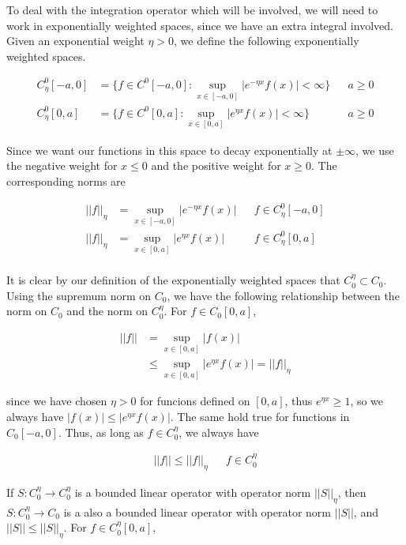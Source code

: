 \documentclass[12pt]{article}
\begin{document}
To deal with the integration operator which will be involved, we will need to work in exponentially weighted spaces, since we have an extra integral involved. Given an exponential weight $\eta > 0$, we define the following exponentially weighted spaces.

\begin{align*}
C^0_\eta[-a, 0] &= \{ f \in C^0[-a, 0] : \sup_{x \in [-a, 0]} |e^{-\eta x} f(x) | < \infty \} && a \geq 0 \\
C^0_\eta[0, a] &= \{ f \in C^0[0, a] : \sup_{x \in [0, a]} |e^{\eta x} f(x) | < \infty \} && a \geq 0 
\end{align*}

Since we want our functions in this space to decay exponentially at $\pm \infty$, we use the negative weight for $x \leq 0$ and the positive weight for $x \geq 0$. The corresponding norms are 

\begin{align*}
|| f ||_\eta &= \sup_{x \in [-a, 0]} |e^{-\eta x} f(x) | && f \in C^0_\eta[-a, 0] \\
|| f ||_\eta &= \sup_{x \in [0, a]} |e^{\eta x} f(x) | && f \in C^0_\eta[0, a] \\
\end{align*}

It is clear by our definition of the exponentially weighted spaces that $C_0^\eta \subset C_0$. Using the supremum norm on $C_0$, we have the following relationship between the norm on $C_0$ and the norm on $C_0^\eta$. For $f \in C_0[0, a]$,

\begin{align*}
|| f || &= \sup_{x \in [0,a]} | f(x) | \\
&\leq \sup_{x \in [0,a]} | e^{\eta x} f(x) | = ||f||_\eta
\end{align*}

since we have chosen $\eta > 0$ for funcions defined on $[0, a]$, thus $e^{\eta x} \geq 1$, so we always have $|f(x)| \leq  |e^{\eta x} f(x)|$. The same hold true for functions in $C_0[-a, 0]$. Thus, as long as $f \in C_0^\eta$, we always have

\begin{align*}
||f|| \leq ||f||_\eta && f \in C_0^\eta
\end{align*}

If $S: C_0^\eta \rightarrow C_0^\eta$ is a bounded linear operator with operator norm $||S||_\eta$, then $S: C_0^\eta \rightarrow C_0$ is a also a bounded linear operator with operator norm $||S||$, and $||S|| \leq ||S||_\eta$. For $f \in C_0^\eta[0,a]$,
\end{document}
